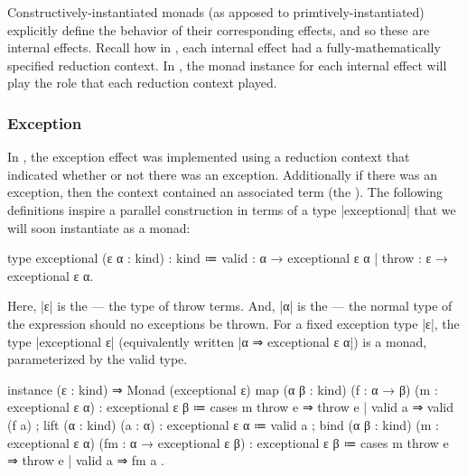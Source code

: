 Constructively-instantiated monads (as apposed to primtively-instantiated) explicitly define the behavior of their corresponding effects, and so these are internal effects.
Recall how in \LangB, each internal effect had a fully-mathematically specified reduction context.
In \LangC, the monad instance for each internal effect will play the role that each \LangB reduction context played.

\subsubsection{Exception}

In \LangB, the exception effect was implemented using a reduction context that indicated whether or not there was an exception.
Additionally if there was an exception, then the context contained an associated term (the ).
The following definitions inspire a parallel construction in terms of a type \code|exceptional| that we will soon instantiate as a monad:
\begin{program}[caption={Definition of \code|exceptional|}, label={lst:def-exceptional}]
type exceptional (ε α : kind) : kind
  ≔ valid : α → exceptional ε α
  | throw : ε → exceptional ε α.
\end{program}
Here, \code|ε| is the  --- the type of throw terms.
And, \code|α| is the  ---  the normal type of the expression should no exceptions be thrown.
For a fixed exception type \code|ε|, the type \code|exceptional ε| (equivalently written \code|α ⇒ exceptional ε α|) is a monad, parameterized by the valid type.

\newpage
\begin{program}[caption={Instance of the exception monad}, label={lst:inst-exception-monad}]
instance (ε : kind) ⇒ Monad (exceptional ε)
  { map (α β : kind)
      (f : α → β) (m : exceptional ε α)
      : exceptional ε β
      ≔ cases m
          { throw e ⇒ throw e
          | valid a ⇒ valid (f a) }
  ; lift (α : kind) (a : α) : exceptional ε α
      ≔ valid a
  ; bind (α β : kind)
      (m : exceptional ε α) (fm : α → exceptional ε β)
      : exceptional ε β
      ≔ cases m
          { throw e ⇒ throw e
          | valid a ⇒ fm a } }.
\end{program}

